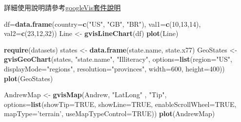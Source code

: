 \documentclass[]{book}
\newenvironment{Shaded}{\begin{snugshade}}{\end{snugshade}}
\newcommand{\KeywordTok}[1]{\textcolor[rgb]{0.13,0.29,0.53}{\textbf{{#1}}}}
\newcommand{\DataTypeTok}[1]{\textcolor[rgb]{0.13,0.29,0.53}{{#1}}}
\newcommand{\DecValTok}[1]{\textcolor[rgb]{0.00,0.00,0.81}{{#1}}}
\newcommand{\StringTok}[1]{\textcolor[rgb]{0.31,0.60,0.02}{{#1}}}
\newcommand{\OtherTok}[1]{\textcolor[rgb]{0.56,0.35,0.01}{{#1}}}
\newcommand{\NormalTok}[1]{{#1}}
\theoremstyle{definition}
\theoremstyle{definition}
\theoremstyle{remark}
\begin{document}
詳細使用說明請參考\href{https://cran.r-project.org/web/packages/googleVis/vignettes/googleVis_examples.html}{googleVis套件說明}

\begin{Shaded}
\begin{Highlighting}[]
\NormalTok{df=}\KeywordTok{data.frame}\NormalTok{(}\DataTypeTok{country=}\KeywordTok{c}\NormalTok{(}\StringTok{"US"}\NormalTok{, }\StringTok{"GB"}\NormalTok{, }\StringTok{"BR"}\NormalTok{), }
              \DataTypeTok{val1=}\KeywordTok{c}\NormalTok{(}\DecValTok{10}\NormalTok{,}\DecValTok{13}\NormalTok{,}\DecValTok{14}\NormalTok{), }
              \DataTypeTok{val2=}\KeywordTok{c}\NormalTok{(}\DecValTok{23}\NormalTok{,}\DecValTok{12}\NormalTok{,}\DecValTok{32}\NormalTok{))}
\NormalTok{Line <-}\StringTok{ }\KeywordTok{gvisLineChart}\NormalTok{(df)}
\KeywordTok{plot}\NormalTok{(Line)}
\end{Highlighting}
\end{Shaded}

\begin{Shaded}
\begin{Highlighting}[]
\KeywordTok{require}\NormalTok{(datasets)}
\NormalTok{states <-}\StringTok{ }\KeywordTok{data.frame}\NormalTok{(state.name, state.x77)}
\NormalTok{GeoStates <-}\StringTok{ }\KeywordTok{gvisGeoChart}\NormalTok{(states, }\StringTok{"state.name"}\NormalTok{, }\StringTok{"Illiteracy"}\NormalTok{,}
                          \DataTypeTok{options=}\KeywordTok{list}\NormalTok{(}\DataTypeTok{region=}\StringTok{"US"}\NormalTok{, }
                                       \DataTypeTok{displayMode=}\StringTok{"regions"}\NormalTok{, }
                                       \DataTypeTok{resolution=}\StringTok{"provinces"}\NormalTok{,}
                                       \DataTypeTok{width=}\DecValTok{600}\NormalTok{, }\DataTypeTok{height=}\DecValTok{400}\NormalTok{))}
\KeywordTok{plot}\NormalTok{(GeoStates)}
\end{Highlighting}
\end{Shaded}

\begin{Shaded}
\begin{Highlighting}[]
\NormalTok{AndrewMap <-}\StringTok{ }\KeywordTok{gvisMap}\NormalTok{(Andrew, }\StringTok{"LatLong"} \NormalTok{, }\StringTok{"Tip"}\NormalTok{, }
                     \DataTypeTok{options=}\KeywordTok{list}\NormalTok{(}\DataTypeTok{showTip=}\OtherTok{TRUE}\NormalTok{, }
                                  \DataTypeTok{showLine=}\OtherTok{TRUE}\NormalTok{, }
                                  \DataTypeTok{enableScrollWheel=}\OtherTok{TRUE}\NormalTok{,}
                                  \DataTypeTok{mapType=}\StringTok{'terrain'}\NormalTok{, }
                                  \DataTypeTok{useMapTypeControl=}\OtherTok{TRUE}\NormalTok{))}
\KeywordTok{plot}\NormalTok{(AndrewMap)}
\end{Highlighting}
\end{Shaded}
\end{document}
